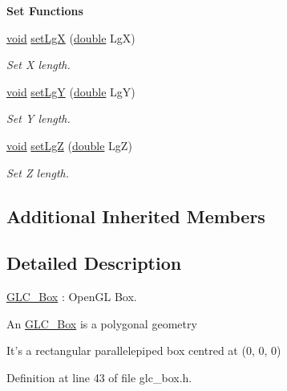\begin{Indent}{\bf Set Functions}\par
\begin{DoxyCompactItemize}
\item 
\hyperlink{group___u_a_v_objects_plugin_ga444cf2ff3f0ecbe028adce838d373f5c}{void} \hyperlink{class_g_l_c___box_aa9b1bf28972a5765c590d66319558921}{set\-Lg\-X} (\hyperlink{_super_l_u_support_8h_a8956b2b9f49bf918deed98379d159ca7}{double} Lg\-X)
\begin{DoxyCompactList}\small\item\em Set X length. \end{DoxyCompactList}\item 
\hyperlink{group___u_a_v_objects_plugin_ga444cf2ff3f0ecbe028adce838d373f5c}{void} \hyperlink{class_g_l_c___box_ad4ccb1341b8e3af7e31a6da5f3111884}{set\-Lg\-Y} (\hyperlink{_super_l_u_support_8h_a8956b2b9f49bf918deed98379d159ca7}{double} Lg\-Y)
\begin{DoxyCompactList}\small\item\em Set Y length. \end{DoxyCompactList}\item 
\hyperlink{group___u_a_v_objects_plugin_ga444cf2ff3f0ecbe028adce838d373f5c}{void} \hyperlink{class_g_l_c___box_a09a2fe68ba143bb6be1f904a54b58509}{set\-Lg\-Z} (\hyperlink{_super_l_u_support_8h_a8956b2b9f49bf918deed98379d159ca7}{double} Lg\-Z)
\begin{DoxyCompactList}\small\item\em Set Z length. \end{DoxyCompactList}\end{DoxyCompactItemize}
\end{Indent}
\subsection*{Additional Inherited Members}


\subsection{Detailed Description}
\hyperlink{class_g_l_c___box}{G\-L\-C\-\_\-\-Box} \-: Open\-G\-L Box. 

An \hyperlink{class_g_l_c___box}{G\-L\-C\-\_\-\-Box} is a polygonal geometry\par
 It's a rectangular parallelepiped box centred at (0, 0, 0) 

Definition at line 43 of file glc\-\_\-box.\-h.



